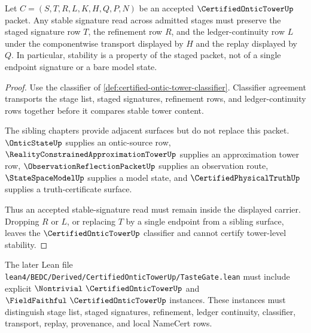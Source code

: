 \begin{theorem}
\label{thm:certified-ontic-tower-signature-stability}
Let $C=(S,T,R,L,K,H,Q,P,N)$ be an accepted $\CertifiedOnticTowerUp$ packet. Any stable signature read across admitted stages must preserve the staged signature row $T$, the refinement row $R$, and the ledger-continuity row $L$ under the componentwise transport displayed by $H$ and the replay displayed by $Q$. In particular, stability is a property of the staged packet, not of a single endpoint signature or a bare model state.
\end{theorem}
\begin{proof}
Use the classifier of \autoref{def:certified-ontic-tower-classifier}. Classifier agreement transports the stage list, staged signatures, refinement rows, and ledger-continuity rows together before it compares stable tower content.

The sibling chapters provide adjacent surfaces but do not replace this packet. $\OnticStateUp$ supplies an ontic-source row, $\RealityConstrainedApproximationTowerUp$ supplies an approximation tower row, $\ObservationReflectionPacketUp$ supplies an observation route, $\StateSpaceModelUp$ supplies a model state, and $\CertifiedPhysicalTruthUp$ supplies a truth-certificate surface.

Thus an accepted stable-signature read must remain inside the displayed carrier. Dropping $R$ or $L$, or replacing $T$ by a single endpoint from a sibling surface, leaves the $\CertifiedOnticTowerUp$ classifier and cannot certify tower-level stability.
\end{proof}

The later Lean file \texttt{lean4/BEDC/Derived/CertifiedOnticTowerUp/TasteGate.lean} must include explicit $\Nontrivial\ \CertifiedOnticTowerUp$ and $\FieldFaithful\ \CertifiedOnticTowerUp$ instances. These instances must distinguish stage list, staged signatures, refinement, ledger continuity, classifier, transport, replay, provenance, and local NameCert rows.



